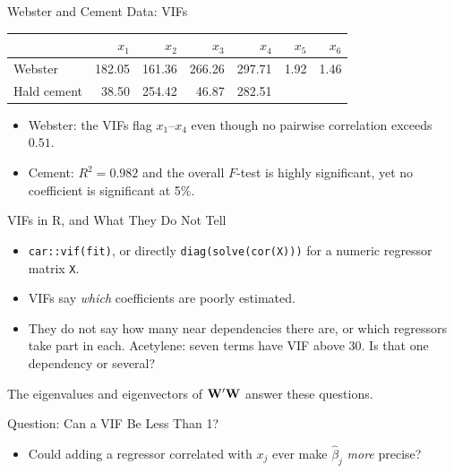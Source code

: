 \begin{frame}{Webster and Cement Data: VIFs}
    \begin{center}
        \small
        \begin{tabular}{lrrrrrr}
            \toprule
            & $x_1$ & $x_2$ & $x_3$ & $x_4$ & $x_5$ & $x_6$ \\
            \midrule
            Webster & 182.05 & 161.36 & 266.26 & 297.71 & 1.92 & 1.46 \\
            Hald cement & 38.50 & 254.42 & 46.87 & 282.51 & & \\
            \bottomrule
        \end{tabular}
    \end{center}
    \begin{itemize}
        \item Webster: the VIFs flag $x_1$--$x_4$ even though no pairwise correlation exceeds $0.51$.
        \item Cement: $R^2=0.982$ and the overall $F$-test is highly significant, yet no coefficient is significant at 5\%.
    \end{itemize}
\end{frame}


\begin{frame}{VIFs in R, and What They Do Not Tell}
    \begin{itemize}
        \item \texttt{car::vif(fit)}, or directly \texttt{diag(solve(cor(X)))} for a numeric regressor matrix \texttt{X}.
        \item VIFs say \emph{which} coefficients are poorly estimated.
        \item They do not say how many near dependencies there are, or which regressors take part in each. Acetylene: seven terms have VIF above 30. Is that one dependency or several?
    \end{itemize}
    \svspace{0.5em}
    The eigenvalues and eigenvectors of $\mathbf{W}'\mathbf{W}$ answer these questions.
\end{frame}


\begin{frame}{Question: Can a VIF Be Less Than 1?}
    \begin{itemize}
        \item Could adding a regressor correlated with $x_j$ ever make $\hat\beta_j$ \emph{more} precise?
    \end{itemize}
\end{frame}


